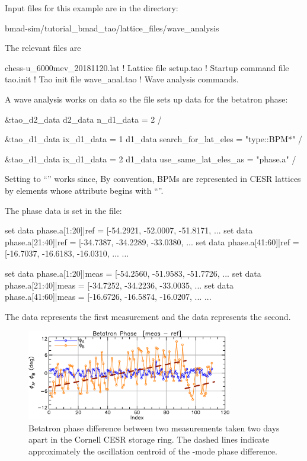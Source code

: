 \documentclass{hitec}     %
\begin{document}
Input files for this example are in the directory:
\begin{code}
bmad-sim/tutorial_bmad_tao/lattice_files/wave_analysis
\end{code}
The relevant files are 
\begin{code}
chess-u_6000mev_20181120.lat    ! Lattice file
setup.tao                       ! Startup command file
tao.init                        ! Tao init file
wave_anal.tao                   ! Wave analysis commands.
\end{code}

A wave analysis works on data so the  file sets up data for the betatron phase:
\begin{code}
&tao_d2_data
  d2_data%
  n_d1_data = 2
/

&tao_d1_data
  ix_d1_data = 1
  d1_data%
  search_for_lat_eles = "type::BPM*"
/

&tao_d1_data
  ix_d1_data = 2
  d1_data%
  use_same_lat_eles_as = "phase.a"
/
\end{code}
Setting  to ``'' works since, By convention, BPMs are
represented in CESR lattices by  elements whose  attribute begins with
``''.

The phase data is set in the  file:
\begin{code}
set data phase.a[1:20]|ref = [-54.2921, -52.0007, -51.8171, ...
set data phase.a[21:40]|ref = [-34.7387, -34.2289, -33.0380, ...
set data phase.a[41:60]|ref = [-16.7037, -16.6183, -16.0310, ...
...

set data phase.a[1:20]|meas = [-54.2560, -51.9583, -51.7726, ...
set data phase.a[21:40]|meas = [-34.7252, -34.2236, -33.0035, ...
set data phase.a[41:60]|meas = [-16.6726, -16.5874, -16.0207, ...
...
\end{code}
The  data represents the first measurement and the  data represents the second.

\begin{figure}[tb]
  \centering
  \includegraphics[width=0.8\textwidth]{betatron-phase-diff.pdf}
  \caption{
Betatron phase difference between two measurements taken two days apart in the Cornell CESR storage
ring. The dashed lines indicate approximately the oscillation centroid of the -mode phase difference.
  }
  \label{f:phase.diff}
\end{figure}
\end{document}

